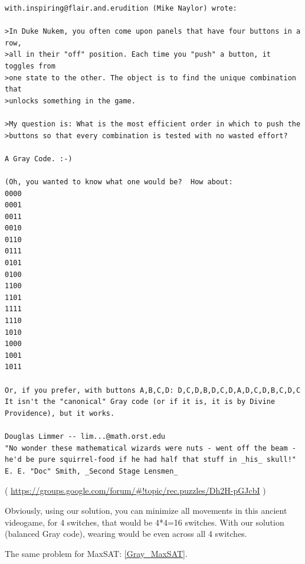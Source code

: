 \begin{lstlisting}
with.inspiring@flair.and.erudition (Mike Naylor) wrote:

>In Duke Nukem, you often come upon panels that have four buttons in a row,
>all in their "off" position. Each time you "push" a button, it toggles from
>one state to the other. The object is to find the unique combination that
>unlocks something in the game.

>My question is: What is the most efficient order in which to push the
>buttons so that every combination is tested with no wasted effort?

A Gray Code. :-)

(Oh, you wanted to know what one would be?  How about:
0000
0001
0011
0010
0110
0111
0101
0100
1100
1101
1111
1110
1010
1000
1001
1011

Or, if you prefer, with buttons A,B,C,D: D,C,D,B,D,C,D,A,D,C,D,B,C,D,C
It isn't the "canonical" Gray code (or if it is, it is by Divine
Providence), but it works.

Douglas Limmer -- lim...@math.orst.edu
"No wonder these mathematical wizards were nuts - went off the beam -
he'd be pure squirrel-food if he had half that stuff in _his_ skull!"
E. E. "Doc" Smith, _Second Stage Lensmen_
\end{lstlisting}

( \url{https://groups.google.com/forum/#!topic/rec.puzzles/Dh2H-pGJcbI} )

Obviously, using our solution, you can minimize all movements in this ancient videogame, for 4 switches, that would be 4*4=16 switches.
With our solution (balanced Gray code), wearing would be even across all 4 switches.

The same problem for MaxSAT: \ref{Gray_MaxSAT}.

